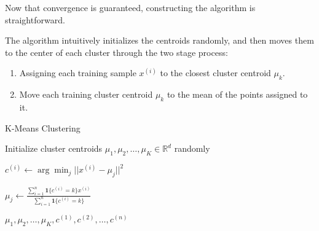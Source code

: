   Now that convergence is guaranteed, constructing the algorithm is straightforward. 

  \begin{algo}
    The algorithm intuitively initializes the centroids randomly, and then moves them to the center of each cluster through the two stage process: 
    \begin{enumerate}
      \item Assigning each training sample $x^{(i)}$ to the closest cluster centroid $\mu_k$. 
      \item Move each training cluster centroid $\mu_k$ to the mean of the points assigned to it. 
    \end{enumerate}
    \begin{algorithm}[H]
    \caption{K-Means Clustering}
    \label{alg:kmeans}
    \begin{algorithmic}[1]
          
      
      \State Initialize cluster centroids $\mu_1, \mu_2, \ldots, \mu_K \in \mathbb{R}^d$ randomly
      
      \Repeat
          \State $c^{(i)} \gets \arg\min_j ||x^{(i)} - \mu_j||^2$
        \EndFor
        
          \State $\mu_j \gets \frac{\sum_{i=1}^n \mathbf{1}\{c^{(i)} = k\} x^{(i)}}{\sum_{i=1}^n \mathbf{1}\{c^{(i)} = k\}}$
        \EndFor
      
      \State \Return $\mu_1, \mu_2, \ldots, \mu_K, c^{(1)}, c^{(2)}, \ldots, c^{(n)}$
      \EndProcedure
    \end{algorithmic}
    \end{algorithm}
  \end{algo} 

